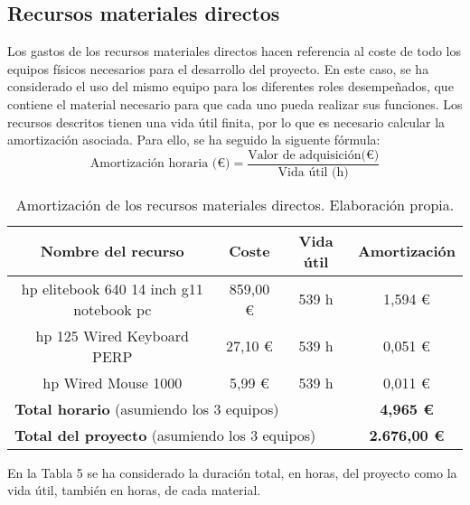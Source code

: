 \subsection{Recursos materiales directos}
Los gastos de los recursos materiales directos hacen referencia al coste de todo los equipos físicos necesarios para el desarrollo del proyecto.
En este caso, se ha considerado el uso del mismo equipo para los diferentes roles desempeñados, que contiene el material 
necesario para que cada uno pueda realizar sus funciones. Los recursos descritos tienen una vida útil finita, por lo que es necesario
calcular la amortización asociada. Para ello, se ha seguido la siguente fórmula:   
\begin{equation}
    \text{Amortización horaria (€)} = \frac{\text{Valor de adquisición(€)}}{\text{Vida útil (h)}}
\end{equation}


\begin{table}[H]
    \centering
    \begin{tabular}{|c|c|c|c|}
        \hline
        \textbf{Nombre del recurso} & \textbf{Coste} & \textbf{Vida útil} & \textbf{Amortización}\\
        \hline
        hp elitebook 640 14 inch g11 notebook pc & 859,00 € & 539 h & 1,594 € \\
        hp 125 Wired Keyboard PERP & 27,10 € & 539 h & 0,051 € \\
        hp Wired Mouse 1000 & 5,99 € & 539 h &  0,011 €\\
        \hline
        \multicolumn{3}{|l|}{\textbf{Total horario} (asumiendo los 3 equipos)}  & \textbf{4,965 €} \\
        \hline
        \multicolumn{3}{|l|}{\textbf{Total del proyecto} (asumiendo los 3 equipos)}  & \textbf{2.676,00 €} \\
        \hline
    \end{tabular}
    \caption{Amortización de los recursos materiales directos. Elaboración propia.}
    \label{tab:recursos_directos}
\end{table}


En la Tabla 5 se ha considerado la duración total, en horas, del proyecto como la vida útil,
también en horas, de cada material.
